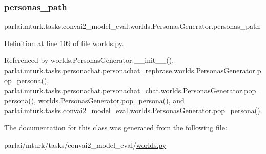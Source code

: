 \subsubsection{\texorpdfstring{personas\+\_\+path}{personas\_path}}
{\footnotesize\ttfamily parlai.\+mturk.\+tasks.\+convai2\+\_\+model\+\_\+eval.\+worlds.\+Personas\+Generator.\+personas\+\_\+path}



Definition at line 109 of file worlds.\+py.



Referenced by worlds.\+Personas\+Generator.\+\_\+\+\_\+init\+\_\+\+\_\+(), parlai.\+mturk.\+tasks.\+personachat.\+personachat\+\_\+rephrase.\+worlds.\+Personas\+Generator.\+pop\+\_\+persona(), parlai.\+mturk.\+tasks.\+personachat.\+personachat\+\_\+chat.\+worlds.\+Personas\+Generator.\+pop\+\_\+persona(), worlds.\+Personas\+Generator.\+pop\+\_\+persona(), and parlai.\+mturk.\+tasks.\+convai2\+\_\+model\+\_\+eval.\+worlds.\+Personas\+Generator.\+pop\+\_\+persona().



The documentation for this class was generated from the following file\+:\begin{DoxyCompactItemize}
\item 
parlai/mturk/tasks/convai2\+\_\+model\+\_\+eval/\hyperlink{parlai_2mturk_2tasks_2convai2__model__eval_2worlds_8py}{worlds.\+py}\end{DoxyCompactItemize}

